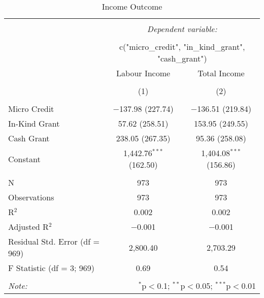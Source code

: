 
\begin{table}[!htbp] \centering 
  \caption{Income Outcome} 
  \label{} 
\small 
\begin{tabular}{@{\extracolsep{5pt}}lcc} 
\\[-1.8ex]\hline 
\hline \\[-1.8ex] 
 & \multicolumn{2}{c}{\textit{Dependent variable:}} \\ 
\cline{2-3} 
\\[-1.8ex] & \multicolumn{2}{c}{c("micro\_credit", "in\_kind\_grant", "cash\_grant")} \\ 
 & Labour Income & Total Income \\ 
\\[-1.8ex] & (1) & (2)\\ 
\hline \\[-1.8ex] 
 Micro Credit & $-$137.98 (227.74) & $-$136.51 (219.84) \\ 
  In-Kind Grant & 57.62 (258.51) & 153.95 (249.55) \\ 
  Cash Grant & 238.05 (267.35) & 95.36 (258.08) \\ 
  Constant & 1,442.76$^{***}$ (162.50) & 1,404.08$^{***}$ (156.86) \\ 
 \hline \\[-1.8ex] 
N & 973 & 973 \\ 
Observations & 973 & 973 \\ 
R$^{2}$ & 0.002 & 0.002 \\ 
Adjusted R$^{2}$ & $-$0.001 & $-$0.001 \\ 
Residual Std. Error (df = 969) & 2,800.40 & 2,703.29 \\ 
F Statistic (df = 3; 969) & 0.69 & 0.54 \\ 
\hline 
\hline \\[-1.8ex] 
\textit{Note:}  & \multicolumn{2}{r}{$^{*}$p$<$0.1; $^{**}$p$<$0.05; $^{***}$p$<$0.01} \\ 
\end{tabular} 
\end{table} 
